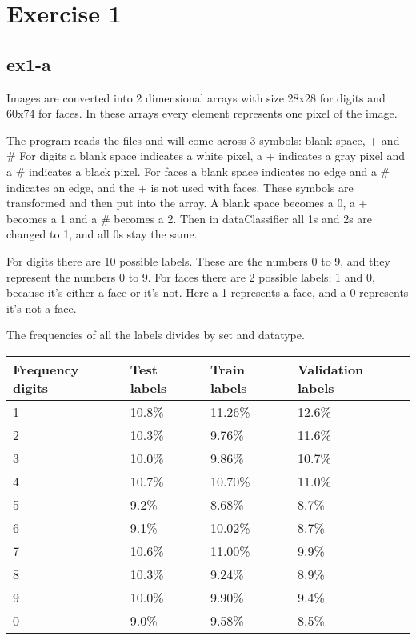 \section{Exercise 1}
\label{sec:ex1}
\subsection{ex1-a}
Images are converted into 2 dimensional arrays with size 28x28 for digits and 60x74 for faces.
In these arrays every element represents one pixel of the image. 

The program reads the files and will come across 3 symbols: blank space, + and \#
For digits a blank space indicates a white pixel, a + indicates a gray pixel and a \# 
indicates a black pixel. For faces a blank space indicates no edge and a \# indicates an edge, 
and the + is not used with faces.
These symbols are transformed and then put into the array. A blank space becomes a 0, a + 
becomes a 1 and a \# becomes a 2.
Then in dataClassifier all 1s and 2s are changed to 1, and all 0s stay the same.

For digits there are 10 possible labels. These are the numbers 0 to 9, and they represent 
the numbers 0 to 9.
For faces there are 2 possible labels: 1 and 0, because it's either a face or it's not. 
Here a 1 represents a face, and a 0 represents it's not a face.

The frequencies of all the labels divides by set and datatype.
\begin{table}[!htbp]
\centering
\begin{tabular}{|l||l|l|l|}
\hline
Frequency digits & Test labels   & Train labels & Validation labels \\ \hline
1 & 10.8\% & 11.26\% & 12.6\% \\ \hline
2 & 10.3\% & 9.76\%  & 11.6\% \\ \hline
3 & 10.0\% & 9.86\%  & 10.7\% \\ \hline
4 & 10.7\% & 10.70\% & 11.0\% \\ \hline
5 & 9.2\%  & 8.68\%  & 8.7\%  \\ \hline
6 & 9.1\%  & 10.02\% & 8.7\%  \\ \hline
7 & 10.6\% & 11.00\% & 9.9\%  \\ \hline
8 & 10.3\% & 9.24\%  & 8.9\%  \\ \hline
9 & 10.0\% & 9.90\%  & 9.4\%  \\ \hline
0 & 9.0\%  & 9.58\%  & 8.5\%  \\ \hline
\end{tabular}
\end{table}

